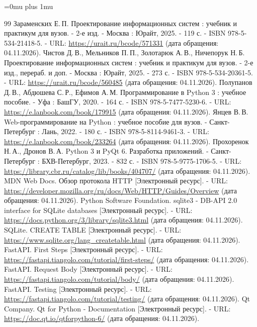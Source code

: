 \renewcommand{\bibname}{Список использованных источников}
\begingroup
\Urlmuskip=0mu plus 1mu
\raggedright
\begin{thebibliography}{99}
 Зараменских Е.\,П. Проектирование информационных систем : учебник и практикум для вузов. - 2-е изд. - Москва : Юрайт, 2025. - 119 с. - ISBN 978-5-534-21418-5. - URL: \url{https://urait.ru/bcode/571331} (дата обращения: 04.11.2026).
 Чистов Д.\,В., Мельников П.\,П., Золотарюк А.\,В., Ничепорук Н.\,Б. Проектирование информационных систем : учебник и практикум для вузов. - 2-е изд., перераб. и доп. - Москва : Юрайт, 2025. - 273 с. - ISBN 978-5-534-20361-5. - URL: \url{https://urait.ru/bcode/560485} (дата обращения: 04.11.2026).
 Полупанов Д.\,В., Абдюшева С.\,Р., Ефимов А.\,М. Программирование в Python 3 : учебное пособие. - Уфа : БашГУ, 2020. - 164 с. - ISBN 978-5-7477-5230-6. - URL: \url{https://e.lanbook.com/book/179915} (дата обращения: 04.11.2026).
 Янцев В.\,В. Web-программирование на Python : учебное пособие для вузов. - Санкт-Петербург : Лань, 2022. - 180 с. - ISBN 978-5-8114-9461-3. - URL: \url{https://e.lanbook.com/book/233264} (дата обращения: 04.11.2026).
 Прохоренок Н.\,А., Дронов В.\,А. Python 3 и PyQt 6. Разработка приложений. - Санкт-Петербург : БХВ-Петербург, 2023. - 832 с. - ISBN 978-5-9775-1706-5. - URL: \url{https://library.cbr.ru/catalog/lib/books/404707/} (дата обращения: 04.11.2026).
 MDN Web Docs. Обзор протокола HTTP [Электронный ресурс]. - URL: \url{https://developer.mozilla.org/ru/docs/Web/HTTP/Guides/Overview} (дата обращения: 04.11.2026).
 Python Software Foundation. sqlite3 - DB-API 2.0 interface for SQLite databases [Электронный ресурс]. - URL: \url{https://docs.python.org/3/library/sqlite3.html} (дата обращения: 04.11.2026).
 SQLite. CREATE TABLE [Электронный ресурс]. - URL: \url{https://www.sqlite.org/lang_createtable.html} (дата обращения: 04.11.2026).
 FastAPI. First Steps [Электронный ресурс]. - URL: \url{https://fastapi.tiangolo.com/tutorial/first-steps/} (дата обращения: 04.11.2026).
 FastAPI. Request Body [Электронный ресурс]. - URL: \url{https://fastapi.tiangolo.com/tutorial/body/} (дата обращения: 04.11.2026).
 FastAPI. Testing [Электронный ресурс]. - URL: \url{https://fastapi.tiangolo.com/tutorial/testing/} (дата обращения: 04.11.2026).
 Qt Company. Qt for Python - Documentation [Электронный ресурс]. - URL: \url{https://doc.qt.io/qtforpython-6/} (дата обращения: 04.11.2026).

\end{thebibliography}
